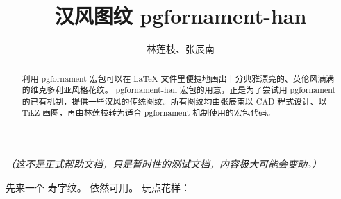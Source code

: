 \documentclass{ctexart}
\title{汉风图纹 pgfornament-han}
\author{林莲枝、张辰南}
\begin{document}
\maketitle

\begin{abstract}
利用 pgfornament 宏包可以在 \LaTeX{} 文件里便捷地画出十分典雅漂亮的、英伦风满满的维克多利亚风格花纹。 pgfornament-han 宏包的用意，正是为了尝试用 pgfornament 的已有机制，提供一些汉风的传统图纹。所有图纹均由张辰南以 CAD 程式设计、以 TikZ 画图，再由林莲枝转为适合 pgfornament 机制使用的宏包代码。
\end{abstract}

\emph{（这不是正式帮助文档，只是暂时性的测试文档，内容极大可能会变动。）}

先来一个  寿字纹。 依然可用。
%
%
玩点花样：
%
\end{document}
